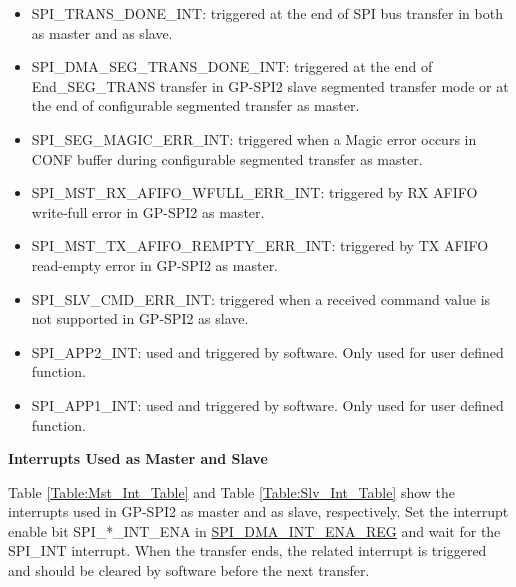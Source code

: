 \documentclass[main\_\_EN.tex]{subfiles}
\begin{document}
\begin{itemize}
\item \label{int:SPITRANSDONEINT}SPI\_TRANS\_DONE\_INT: triggered at the end of SPI bus transfer in both as master and as slave. 
\item \label{int:SPIDMASEGTRANSDONEINT}SPI\_DMA\_SEG\_TRANS\_DONE\_INT: triggered at the end of End\_SEG\_TRANS transfer in GP-SPI2 slave segmented transfer mode or at the end of configurable segmented transfer as master.
\item \label{int:SPISEGMAGICERRINT} SPI\_SEG\_MAGIC\_ERR\_INT: triggered when a Magic error occurs in CONF buffer during configurable segmented transfer as master.


\item \label{int:SPIMSTRXAFIFOWFULLERRINT}
SPI\_MST\_RX\_AFIFO\_WFULL\_ERR\_INT: triggered by RX AFIFO write-full error in GP-SPI2 as master.

\item \label{int:SPIMSTTXAFIFOREMPTYERRINT}
SPI\_MST\_TX\_AFIFO\_REMPTY\_ERR\_INT: triggered by TX AFIFO read-empty error in GP-SPI2 as master.

\item \label{int:SPISLVCMDERRINT} SPI\_SLV\_CMD\_ERR\_INT: triggered when a received command value is not supported in GP-SPI2 as slave.

\item \label{int:SPIAPP2INT}SPI\_APP2\_INT: used and triggered by software. Only used for user defined function. 
\item \label{int:SPIAPP1INT}SPI\_APP1\_INT: used and triggered by software. Only used for user defined function.

\end{itemize}

\textbf{Interrupts Used as Master and Slave}

Table \ref{Table:Mst_Int_Table} and Table \ref{Table:Slv_Int_Table} show the interrupts used in GP-SPI2 as master and as slave, respectively. Set the interrupt enable bit SPI\_*\_INT\_ENA in \hyperref[regdesc:SPIDMAINTENAREG]{SPI\_DMA\_INT\_ENA\_REG} and wait for the SPI\_INT interrupt. When the transfer ends, the related interrupt is triggered and should be cleared by software before the next transfer.
\end{document}
